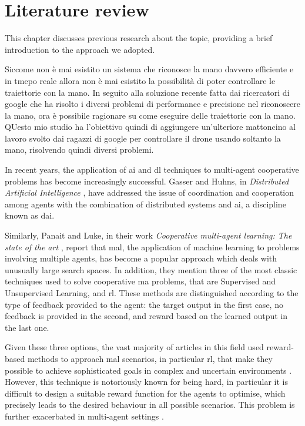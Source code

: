 \setcounter{chapter}{0}
\chapter{Literature review}
\label{chap:stateoftheart}
This chapter discusses previous research about the topic, providing a brief 
introduction to the approach we adopted.


\bigskip
Siccome non è mai esistito un sistema che riconosce la mano davvero efficiente e in tmepo reale allora non è mai esistito la possibilità di poter controllare le traiettorie con la mano. In seguito alla soluzione recente fatta dai ricercatori di google che ha risolto i diversi problemi di performance e precisione nel riconoscere la mano, ora è possibile ragionare su come eseguire delle traiettorie con la mano. QUesto mio studio ha l'obiettivo quindi di aggiungere un'ulteriore mattoncino al lavoro svolto dai ragazzi di google per controllare il drone usando soltanto la mano, risolvendo quindi diversi problemi.


In recent years, the application of \gls{ai} and \gls{dl} techniques to multi-agent 
cooperative problems has become increasingly successful.
Gasser and Huhns, in \emph{Distributed Artificial Intelligence} 
\cite[][]{gasser2014distributed}, have addressed the issue of coordination and 
cooperation among agents with the combination of distributed systems and 
\gls{ai}, a discipline known as \gls{dai}. 

Similarly, Panait and Luke, in their work \emph{Cooperative multi-agent learning: 
	The state of the art} \cite[][]{panait2005cooperative}, report that \gls{mal}, the 
application of machine learning to problems involving multiple agents, has 
become a popular approach which deals with unusually large search spaces. 
In addition, they mention three of the most classic techniques used to solve 
cooperative \gls{ma} problems, that are Supervised and Unsupervised Learning, 
and \gls{rl}. These methods are distinguished according to the type of feedback 
provided to the agent: the target output in the first case, no feedback is provided 
in the second, and reward based on the learned output in the last one.

Given these three options, the vast majority of articles in this field used 
reward-based methods to approach \gls{mal} scenarios, in particular \gls{rl}, that 
make they possible to achieve sophisticated goals in complex and uncertain 
environments \cite[][]{oliehoek2012decentralised}. 
However, this technique is notoriously known for being hard, in particular it is 
difficult to design a suitable reward function for the agents to optimise, which 
precisely leads to the desired behaviour in all possible scenarios. This problem is 
further exacerbated in multi-agent settings \cite[][]{hadfield2017inverse, 
	oliehoek2012decentralised}.

